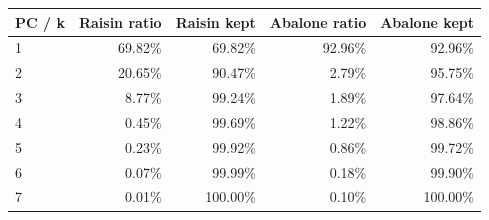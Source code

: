 \begin{tabular}{lrrrr}
\toprule
PC / k & Raisin ratio & Raisin kept & Abalone ratio & Abalone kept \\
\midrule
1 & 69.82\% & 69.82\% & 92.96\% & 92.96\% \\
2 & 20.65\% & 90.47\% & 2.79\% & 95.75\% \\
3 & 8.77\% & 99.24\% & 1.89\% & 97.64\% \\
4 & 0.45\% & 99.69\% & 1.22\% & 98.86\% \\
5 & 0.23\% & 99.92\% & 0.86\% & 99.72\% \\
6 & 0.07\% & 99.99\% & 0.18\% & 99.90\% \\
7 & 0.01\% & 100.00\% & 0.10\% & 100.00\% \\
\bottomrule
\end{tabular}
